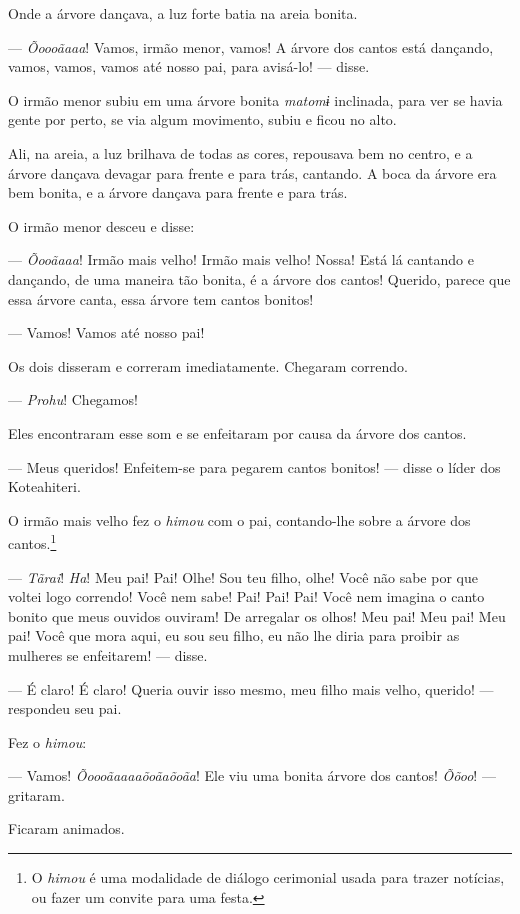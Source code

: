 Onde a árvore dançava, a luz forte batia na areia bonita. 

--- \textit{Õoooãaaa}! Vamos, irmão menor, vamos! A árvore dos cantos está
dançando, vamos, vamos, vamos até nosso pai, para avisá-lo! --- disse. 

O irmão menor subiu em uma árvore bonita \textit{matomɨ} inclinada, para
ver se havia gente por perto, se via algum movimento, subiu e ficou
no alto. 

Ali, na areia, a luz brilhava de todas as cores, repousava bem no
centro, e a árvore dançava devagar para frente e para trás, cantando. A boca da árvore era bem bonita, e a árvore dançava para frente e para
trás. 

O irmão menor desceu e disse:

--- \textit{Õooãaaa}! Irmão mais velho! Irmão mais velho! Nossa! Está lá cantando
e dançando, de uma maneira tão bonita, é a árvore dos cantos! Querido,
parece que essa árvore canta, essa árvore tem cantos bonitos! 

--- Vamos! Vamos até nosso pai! 

Os dois disseram e correram imediatamente. Chegaram correndo.

--- \textit{Prohu}! Chegamos! 

Eles encontraram esse som e se enfeitaram por causa da árvore dos cantos. 

--- Meus queridos! Enfeitem-se para pegarem cantos bonitos! --- disse o
líder dos Koteahiteri. 

O irmão mais velho fez o \textit{himou} com o pai, contando-lhe sobre a
árvore dos cantos.\footnote{O \textit{himou} é uma modalidade de diálogo cerimonial usada para trazer notícias, ou fazer um convite para uma festa.}

--- \textit{Tãrai}! \textit{Ha}! Meu pai! Pai! Olhe! Sou teu filho, olhe! Você não sabe
por que voltei logo correndo! Você nem sabe! Pai! Pai! Pai! Você nem
imagina o canto bonito que meus ouvidos ouviram! De arregalar os olhos!
Meu pai! Meu pai! Meu pai! Você que mora aqui, eu sou seu filho, eu não
lhe diria para proibir as mulheres se enfeitarem! --- disse. 

--- É claro! É claro! Queria ouvir isso mesmo, meu filho mais velho,
querido! --- respondeu seu pai. 

Fez o \textit{himou}: 

--- Vamos! \textit{Õoooãaaaaõoãaõoãa}! Ele viu uma bonita árvore dos cantos!
\textit{Õõoo}! --- gritaram. 

Ficaram animados.

